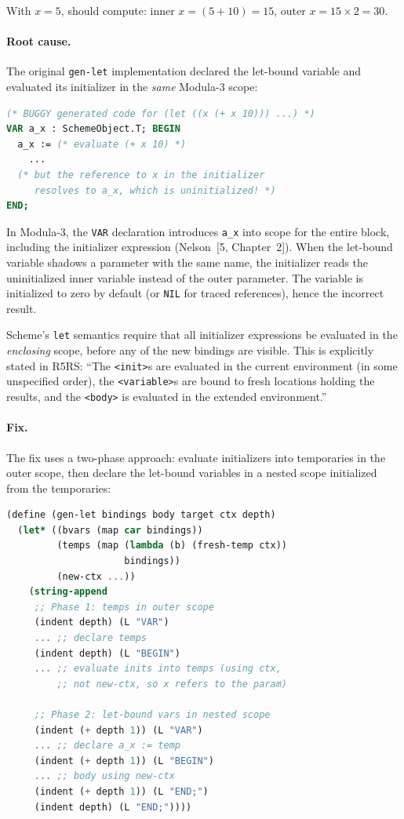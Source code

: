 \documentclass[12pt]{report}
\begin{document}
With $x = 5$, should compute: inner $x = (5 + 10) = 15$, outer
$x = 15 \times 2 = 30$.

\paragraph{Root cause.}
The original \texttt{gen-let} implementation declared the let-bound
variable and evaluated its initializer in the \emph{same} Modula-3
scope:

\begin{lstlisting}[language=Modula3]
(* BUGGY generated code for (let ((x (+ x 10))) ...) *)
VAR a_x : SchemeObject.T; BEGIN
  a_x := (* evaluate (+ x 10) *)
    ...
  (* but the reference to x in the initializer
     resolves to a_x, which is uninitialized! *)
END;
\end{lstlisting}

In Modula-3, the \texttt{VAR} declaration introduces \texttt{a\_x}
into scope for the entire block, including the initializer
expression (Nelson~[5, Chapter~2]).  When the let-bound variable
shadows a parameter with the same name, the initializer reads the
uninitialized inner variable instead of the outer parameter.  The
variable is initialized to zero by default (or \texttt{NIL} for
traced references), hence the incorrect result.

Scheme's \texttt{let} semantics require that all initializer
expressions be evaluated in the \emph{enclosing} scope, before any
of the new bindings are visible.  This is explicitly stated in R5RS:
``The \texttt{<init>}s are evaluated in the current environment (in
some unspecified order), the \texttt{<variable>}s are bound to fresh
locations holding the results, and the \texttt{<body>} is evaluated
in the extended environment.''

\paragraph{Fix.}
The fix uses a two-phase approach: evaluate initializers into
temporaries in the outer scope, then declare the let-bound variables
in a nested scope initialized from the temporaries:

\begin{lstlisting}[language=Scheme]
(define (gen-let bindings body target ctx depth)
  (let* ((bvars (map car bindings))
         (temps (map (lambda (b) (fresh-temp ctx))
                     bindings))
         (new-ctx ...))
    (string-append
     ;; Phase 1: temps in outer scope
     (indent depth) (L "VAR")
     ... ;; declare temps
     (indent depth) (L "BEGIN")
     ... ;; evaluate inits into temps (using ctx,
         ;; not new-ctx, so x refers to the param)

     ;; Phase 2: let-bound vars in nested scope
     (indent (+ depth 1)) (L "VAR")
     ... ;; declare a_x := temp
     (indent (+ depth 1)) (L "BEGIN")
     ... ;; body using new-ctx
     (indent (+ depth 1)) (L "END;")
     (indent depth) (L "END;"))))
\end{lstlisting}
\end{document}
